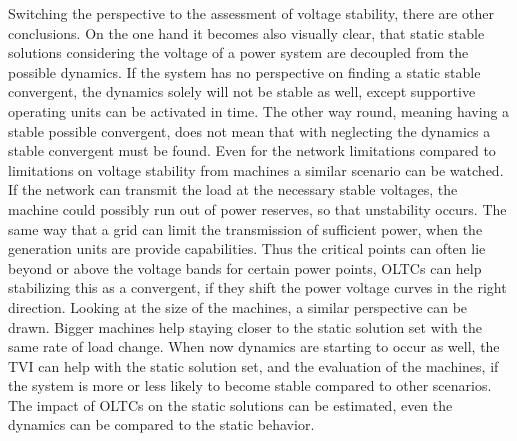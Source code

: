 Switching the perspective to the assessment of voltage stability, there are other conclusions.
On the one hand it becomes also visually clear, that static stable solutions considering the voltage of a power system are decoupled from the possible dynamics.
If the system has no perspective on finding a static stable convergent, the dynamics solely will not be stable as well, except supportive operating units can be activated in time.
The other way round, meaning having a stable possible convergent, does not mean that with neglecting the dynamics a stable convergent must be found.
Even for the network limitations compared to limitations on voltage stability from machines a similar scenario can be watched.
If the network can transmit the load at the necessary stable voltages, the machine could possibly run out of power reserves, so that unstability occurs.
The same way that a grid can limit the transmission of sufficient power, when the generation units are provide capabilities.
Thus the critical points can often lie beyond or above the voltage bands for certain power points, \acsp{OLTC} can help stabilizing this as a convergent, if they shift the power voltage curves in the right direction.
Looking at the size of the machines, a similar perspective can be drawn. 
Bigger machines help staying closer to the static solution set with the same rate of load change.
When now dynamics are starting to occur as well, the \acs{TVI} can help with the static solution set, and the evaluation of the machines, if the system is more or less likely to become stable compared to other scenarios.
The impact of \acsp{OLTC} on the static solutions can be estimated, even the dynamics can be compared to the static behavior.


